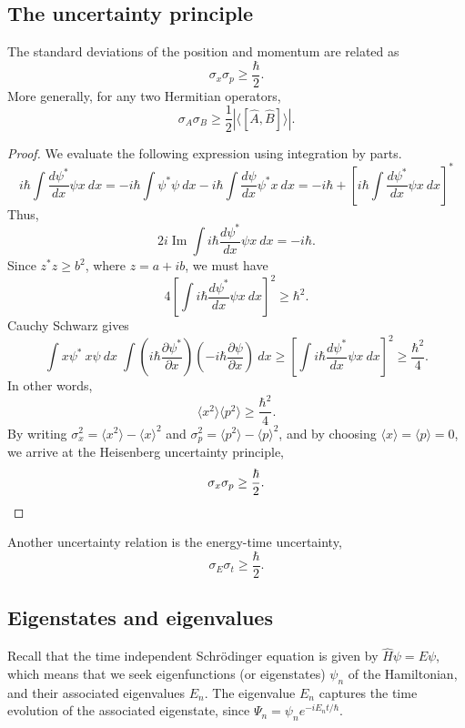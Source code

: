 \documentclass[11pt]{article}
\newcommand\ddx[1]{\frac{d #1}{d x}}
\newcommand\ppx[1]{\frac{\partial #1}{\partial x}}
\newcommand\E[1]{\langle #1 \rangle}
\theoremstyle{definition}
\theoremstyle{remark}
\numberwithin{equation}{section}
\begin{document}
    \subsection{The uncertainty principle}
    \begin{theorem}
        The standard deviations of the position and momentum are related as \[
            \sigma_x \sigma_p \geq \frac{\hbar}{2}.
        \] More generally, for any two Hermitian operators, \[
            \sigma_A \sigma_B \geq \frac{1}{2}|\E{[\hat{A}, \hat{B}]}|.
        \] 
    \end{theorem}
    \begin{proof}
        We evaluate the following expression using integration by parts. \[
            i\hbar \int \ddx{\psi^*}\psi x\:dx = -i\hbar\int \psi^*\psi\:dx - i\hbar
            \int \ddx{\psi}\psi^* x\:dx = -i\hbar + \left[i\hbar \int \ddx{\psi^*}
            \psi x\:dx\right]^*
        \]
         Thus, \[
            2i\operatorname{Im}\int i\hbar \ddx{\psi^*}\psi x\:dx = -i\hbar. 
        \] Since $z^*z \geq b^2$, where $z = a + ib$, we must have \[
            4\left[\int i\hbar \ddx{\psi^*}\psi x\:dx\right]^2 \geq \hbar^2.
        \] Cauchy Schwarz gives \[
            \int x\psi^*\:x\psi \:dx \;\int
            \left(i\hbar\ppx{\psi^*}\right)\left(-i\hbar\ppx{\psi}\right) \:dx \geq
            \left[\int i\hbar \ddx{\psi^*}\psi x\:dx\right]^2 \geq
            \frac{\hbar^2}{4}.
        \] In other words, \[
            \E{x^2}\E{p^2} \geq \frac{\hbar^2}{4}.
        \] By writing $\sigma_x^2 = \E{x^2} - \E{x}^2$ and $\sigma_p^2 = \E{p^2} -
        \E{p}^2$, and by choosing $\E{x} = \E{p} = 0$, we arrive at the Heisenberg
        uncertainty principle, \[
            \sigma_x\sigma_p \geq \frac{\hbar}{2}. \qedhere
        \]
    \end{proof}

    Another uncertainty relation is the energy-time uncertainty, \[
        \sigma_E \sigma_t \geq \frac{\hbar}{2}.
    \]

    \subsection{Eigenstates and eigenvalues}
    Recall that the time independent Schr\"odinger equation is given by $\hat{H}\psi
    = E\psi$, which means that we seek eigenfunctions (or eigenstates) $\psi_n$ of
    the Hamiltonian, and their associated eigenvalues $E_n$. The eigenvalue $E_n$
    captures the time evolution of the associated eigenstate, since $\Psi_n = \psi_n
    e^{-iE_n t/ \hbar}$.
\end{document}
